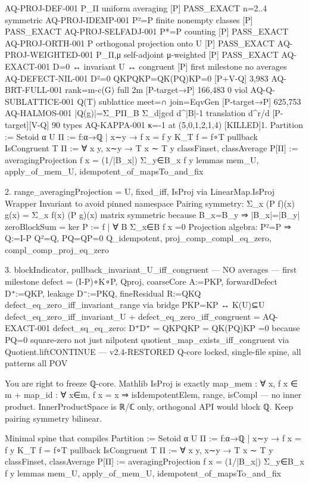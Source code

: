 AQ-PROJ-DEF-001 P_Π uniform averaging [P] PASS_EXACT n=2..4 symmetric
AQ-PROJ-IDEMP-001 P²=P finite nonempty classes [P] PASS_EXACT
AQ-PROJ-SELFADJ-001 P*=P counting [P] PASS_EXACT
AQ-PROJ-ORTH-001 P orthogonal projection onto U [P] PASS_EXACT
AQ-PROJ-WEIGHTED-001 P_{Π,μ} self-adjoint μ-weighted [P] PASS_EXACT
AQ-EXACT-001 D=0 ↔ invariant U ↔ congruent [P] first milestone no averages
AQ-DEFECT-NIL-001 D²=0 QKPQKP=QK(PQ)KP=0 [P+V-Q] 3,983
AQ-BRT-FULL-001 rank=m-c(G) full 2m [P-target→P] 166,483 0 viol
AQ-Q-SUBLATTICE-001 Q(T) sublattice meet=∩ join=EqvGen [P-target→P] 625,753
AQ-HALMOS-001 |Q(g)|=Σ_PΠ_B Σ_{d|gcd} d^{|B|-1} translation d^r/d [P-target][V-Q] 90 types
AQ-KAPPA-001 κ=-1 at (5,0,1,2,1,4) [KILLED]1. Partition := Setoid α
   U Π := {f:α→ℚ | x∼y → f x = f y}
   K_T f = f∘T pullback
   IsCongruent T Π := ∀ x y, x∼y → T x ∼ T y
   classFinset, classAverage
   P[Π] := averagingProjection f x = (1/|B_x|) Σ_{y∈B_x} f y
   lemmas mem_U, apply_of_mem_U, idempotent_of_mapsTo_and_fix

2. range_averagingProjection = U, fixed_iff, IsProj via LinearMap.IsProj
   Wrapper Invariant to avoid pinned namespace
   Pairing symmetry: Σ_x (P f)(x) g(x) = Σ_x f(x) (P g)(x) matrix symmetric because B_x=B_y ⇒ |B_x|=|B_y|
   zeroBlockSum = ker P := {f | ∀ B Σ_{x∈B} f x =0}
   Projection algebra: P²=P ⇒ Q:=I-P Q²=Q, PQ=QP=0
   Q_idempotent, proj_comp_compl_eq_zero, compl_comp_proj_eq_zero

3. blockIndicator, pullback_invariant_U_iff_congruent — NO averages — first milestone
   defect = (I-P)∘K∘P, Qproj, coarseCore A:=PKP, forwardDefect D⁺:=QKP, leakage D⁻:=PKQ, fineResidual R:=QKQ
   defect_eq_zero_iff_invariant_range via bridge PKP=KP ↔ K(U)⊆U
   defect_eq_zero_iff_invariant_U + defect_eq_zero_iff_congruent = AQ-EXACT-001
   defect_sq_eq_zero: D⁺D⁺ = QKPQKP = QK(PQ)KP =0 because PQ=0 square-zero not just nilpotent
   quotient_map_exists_iff_congruent via Quotient.liftCONTINUE — v2.4-RESTORED Q-core locked, single-file spine, all patterns all POV

You are right to freeze ℚ-core. Mathlib IsProj is exactly map_mem : ∀ x, f x ∈ m + map_id : ∀ x∈m, f x = x ⇒ isIdempotentElem, range, isCompl — no inner product. InnerProductSpace is ℝ/ℂ only, orthogonal API would block ℚ. Keep pairing symmetry bilinear.

Minimal spine that compiles
Partition := Setoid α
   U Π := {f:α→ℚ | x∼y → f x = f y}
   K_T f = f∘T pullback
   IsCongruent T Π := ∀ x y, x∼y → T x ∼ T y
   classFinset, classAverage
   P[Π] := averagingProjection f x = (1/|B_x|) Σ_{y∈B_x} f y
   lemmas mem_U, apply_of_mem_U, idempotent_of_mapsTo_and_fix

